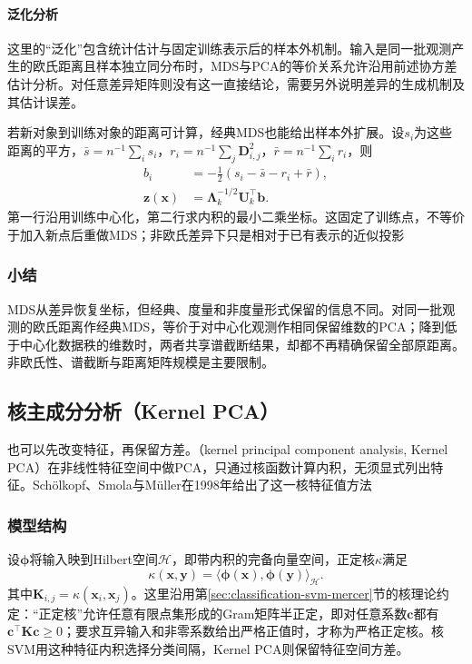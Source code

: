 \paragraph{泛化分析}

这里的“泛化”包含统计估计与固定训练表示后的样本外机制。输入是同一批观测产生的欧氏距离且样本独立同分布时，MDS与PCA的等价关系允许沿用前述协方差估计分析。对任意差异矩阵则没有这一直接结论，需要另外说明差异的生成机制及其估计误差。

若新对象到训练对象的距离可计算，经典MDS也能给出样本外扩展。设$s_i$为这些距离的平方，$\bar s=n^{-1}\sum_i s_i$，$r_i=n^{-1}\sum_j\bm{D}_{i,j}^2$，$\bar r=n^{-1}\sum_i r_i$，则
\begin{equation}
  \label{eq:dim-mds-extension}
  \begin{aligned}
    b_i&=-\frac12(s_i-\bar s-r_i+\bar r),\\
    \bm{z}(\bm{x})
      &=\bm{\Lambda}_k^{-1/2}\bm{U}_k^{\top}\bm{b}.
  \end{aligned}
\end{equation}
第一行沿用训练中心化，第二行求内积的最小二乘坐标。这固定了训练点，不等价于加入新点后重做MDS；非欧氏差异下只是相对于已有表示的近似投影

\subsubsection{小结}

MDS从差异恢复坐标，但经典、度量和非度量形式保留的信息不同。对同一批观测的欧氏距离作经典MDS，等价于对中心化观测作相同保留维数的PCA；降到低于中心化数据秩的维数时，两者共享谱截断结果，却都不再精确保留全部原距离。非欧氏性、谱截断与距离矩阵规模是主要限制。

\subsection{核主成分分析（Kernel PCA）}
\label{sec:dim-kpca}

也可以先改变特征，再保留方差。（kernel principal component analysis, Kernel PCA）在非线性特征空间中做PCA，只通过核函数计算内积，无须显式列出特征。Schölkopf、Smola与Müller在1998年给出了这一核特征值方法

\subsubsection{模型结构}

设$\bm{\phi}$将输入映到Hilbert空间$\mathcal{H}$，即带内积的完备向量空间，正定核$\kappa$满足
\[
  \kappa(\bm{x},\bm{y})
  =\langle\bm{\phi}(\bm{x}),\bm{\phi}(\bm{y})\rangle_{\mathcal{H}}.
\]
其中$\bm{K}_{i,j}=\kappa(\bm{x}_i,\bm{x}_j)$。这里沿用第\ref{sec:classification-svm-mercer}节的核理论约定：“正定核”允许任意有限点集形成的Gram矩阵半正定，即对任意系数$\bm{c}$都有$\bm{c}^{\top}\bm{K}\bm{c}\geq0$；要求互异输入和非零系数给出严格正值时，才称为严格正定核。核SVM用这种特征内积选择分类间隔，Kernel PCA则保留特征空间方差。

